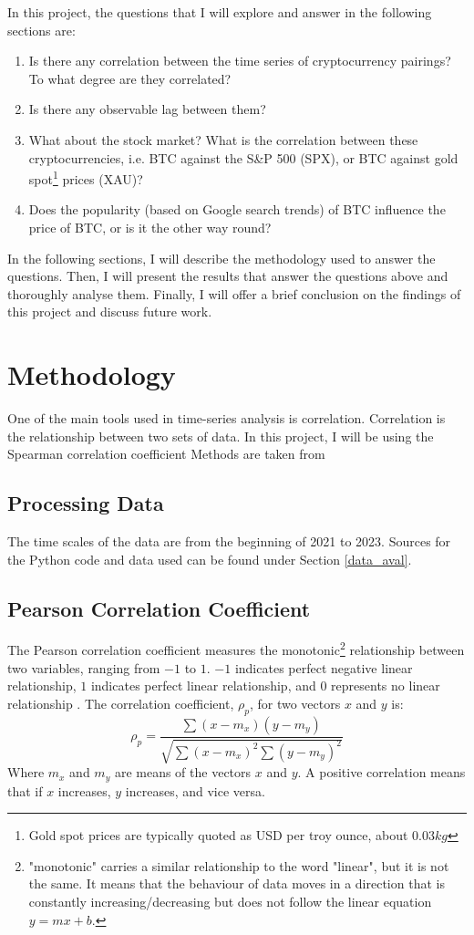 \documentclass[a4paper, 10pt, conference]{ieeeconf}      %
\begin{document}
In this project, the questions that I will explore and answer in the following sections are:
\begin{enumerate}
    \item Is there any correlation between the time series of cryptocurrency pairings? To what degree are they correlated? %
    \item Is there any observable lag between them? %
    \item What about the stock market? What is the correlation between these cryptocurrencies, i.e. BTC against the S\&P 500 (SPX), or BTC against gold spot\footnote{Gold spot prices are typically quoted as USD per troy ounce, about $0.03kg$} prices (XAU)?
    \item Does the popularity (based on Google search trends) of BTC influence the price of BTC, or is it the other way round?
\end{enumerate}

In the following sections, I will describe the methodology used to answer the questions. Then, I will present the results that answer the questions above and thoroughly analyse them. Finally, I will offer a brief conclusion on the findings of this project and discuss future work.

\section{Methodology}
One of the main tools used in time-series analysis is correlation. Correlation is the relationship between two sets of data. In this project, I will be using the Spearman correlation coefficient  Methods are taken from \cite{Pal2017}
\subsection{Processing Data}
The time scales of the data are from the beginning of 2021 to 2023. Sources for the Python code and data used can be found under Section \ref{data_aval}.
\subsection{Pearson Correlation Coefficient}\label{Pearson}
The Pearson correlation coefficient measures the monotonic\footnote{"monotonic" carries a similar relationship to the word "linear", but it is not the same. It means that the behaviour of data moves in a direction that is constantly increasing/decreasing but does not follow the linear equation $y = mx + b$.} relationship between two variables, ranging from $-1$ to $1$. $-1$ indicates perfect negative linear relationship, $1$ indicates perfect linear relationship, and $0$ represents no  linear relationship \cite{Dowdy1983}. The correlation coefficient, $\rho_{p}$, for two vectors $x$ and $y$ is:
\begin{equation}
    \rho_{p} = \frac{\sum(x-m_x)(y-m_y)}{\sqrt{\sum(x-m_x)^2\sum(y-m_y)^2}}
\end{equation}
Where $m_x$ and $m_y$ are means of the vectors $x$ and $y$. A positive correlation means that if $x$ increases, $y$ increases, and vice versa.
\end{document}

